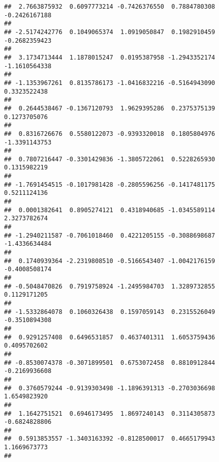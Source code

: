 \documentclass[]{article}
\begin{document}
\begin{verbatim}
##  2.7663875932  0.6097773214 -0.7426376550  0.7884780308 -0.2426167188 
##                                                                       
## -2.5174242776  0.1049065374  1.0919050847  0.1982910459 -0.2682359423 
##                                                                       
##  3.1734713444  1.1878015247  0.0195387958 -1.2943352174 -1.1610564338 
##                                                                       
## -1.1353967261  0.8135786173 -1.0416832216 -0.5164943090  0.3323522438 
##                                                                       
##  0.2644538467 -0.1367120793  1.9629395286  0.2375375139  0.1273705076 
##                                                                       
##  0.8316726676  0.5580122073 -0.9393320018  0.1805804976 -1.3391143753 
##                                                                       
##  0.7807216447 -0.3301429836 -1.3805722061  0.5228265930  0.1315982219 
##                                                                       
## -1.7691454515 -0.1017981428 -0.2805596256 -0.1417481175  0.5211124136 
##                                                                       
##  0.0001382641  0.8905274121  0.4318940685 -1.0345589114  2.3273782674 
##                                                                       
## -1.2940211587 -0.7061018460  0.4221205155 -0.3088698687 -1.4336634484 
##                                                                       
##  0.1740939364 -2.2319808510 -0.5166543407 -1.0042176159 -0.4008508174 
##                                                                       
## -0.5048470826  0.7919758924 -1.2495984703  1.3289732855  0.1129171205 
##                                                                       
## -1.5332864078  0.1060326438  0.1597059143  0.2315526049 -0.3510894308 
##                                                                       
##  0.9291257408  0.6496531857  0.4637401311  1.6053759436  0.4095702602 
##                                                                       
## -0.8530074378 -0.3071899501  0.6753072458  0.8810912844 -0.2169936608 
##                                                                       
##  0.3760579244 -0.9139303498 -1.1896391313 -0.2703036698  1.6549823920 
##                                                                       
##  1.1642751521  0.6946173495  1.8697240143  0.3114305873 -0.6824828806 
##                                                                       
##  0.5913853557 -1.3403163392 -0.8128500017  0.4665179943  1.1669673773 
##                                                                       

\end{verbatim}
\end{document}
